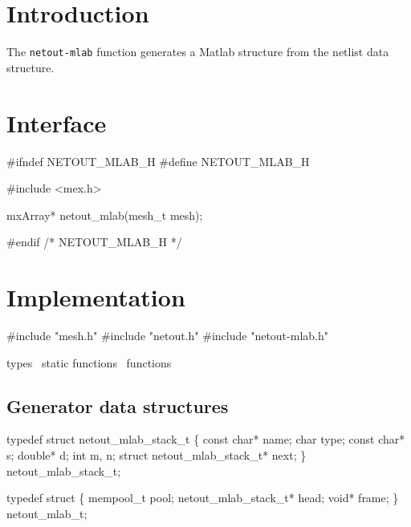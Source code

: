 
\section{Introduction}

The {\tt{}netout-mlab} function generates a Matlab structure from
the netlist data structure.


\section{Interface}

\endmoddef
#ifndef NETOUT_MLAB_H
#define NETOUT_MLAB_H

#include <mex.h>

mxArray* netout_mlab(mesh_t mesh);

#endif /* NETOUT_MLAB_H */
\nwendcode{}\nwdocspar


\section{Implementation}

\nwenddocs{}\endmoddef
#include "mesh.h"
#include "netout.h"
#include "netout-mlab.h"

\LA{}types~{\nwtagstyle{}}\RA{}
\LA{}static functions~{\nwtagstyle{}}\RA{}
\LA{}functions~{\nwtagstyle{}}\RA{}
\nwendcode{}\nwdocspar


\subsection{Generator data structures}

\nwenddocs{}\endmoddef
typedef struct netout_mlab_stack_t \{
    const char* name;
    char        type;
    const char* s;
    double*     d;
    int         m, n;
    struct netout_mlab_stack_t* next;
\} netout_mlab_stack_t;

typedef struct \{
    mempool_t pool;
    netout_mlab_stack_t* head;
    void* frame;
\} netout_mlab_t;

